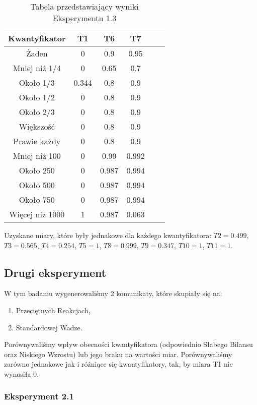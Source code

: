\documentclass{classrep}
\begin{document}
\begin{table}[H]
	\centering
	\begin{tabular}{c c c c c c} 
		\hline
		\textbf{Kwantyfikator} & \textbf{T1} & \textbf{T6} & \textbf{T7}\\ [0.5ex] 
		\hline
		\hline 
		Żaden & 0 & 0.9 & 0.95 \\ 
		Mniej niż 1/4 & 0 & 0.65 & 0.7 \\
		Około 1/3 & 0.344 & 0.8 & 0.9 \\
		Około 1/2 & 0 & 0.8 & 0.9 \\
		Około 2/3 & 0 & 0.8 & 0.9 \\
		Większość & 0 & 0.8 & 0.9  \\
		Prawie każdy & 0 & 0.8 & 0.9  \\
		Mniej niż 100 & 0 & 0.99 & 0.992  \\
		Około 250 & 0 & 0.987 & 0.994  \\
		Około 500 & 0 & 0.987 & 0.994  \\
		Około 750 & 0 & 0.987 & 0.994  \\
		Więcej niż 1000 & 1 & 0.987 & 0.063  \\
		\hline
	\end{tabular}
	\caption{Tabela przedstawiający wyniki Eksperymentu 1.3}
\end{table}

Uzyskane miary, które były jednakowe dla każdego kwantyfikatora: $T2 = 0.499$, $T3 = 0.565$, $T4 = 0.254$, $T5 = 1$, $T8 = 0.999$, $T9 = 0.347$, $T10 = 1$, $T11 = 1$.

\subsection{Drugi eksperyment}

W tym badaniu wygenerowaliśmy 2 komunikaty, które skupiały się na:
\begin{enumerate}
	\item Przeciętnych Reakcjach,
	\item Standardowej Wadze.
\end{enumerate}
Porównywaliśmy wpływ obecności kwantyfikatora (odpowiednio Słabego Bilansu oraz Niskiego Wzrostu) lub jego braku na wartości miar. Porównywaliśmy zarówno jednakowe jak i różniące się kwantyfikatory, tak, by miara T1 nie wynosiła 0.

\subsubsection{Eksperyment 2.1}
\end{document}
